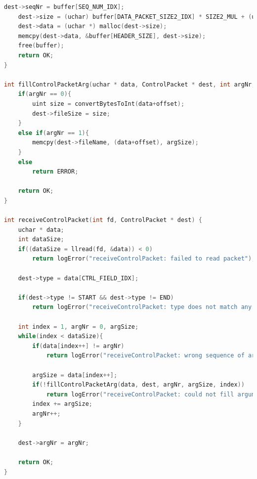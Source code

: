 \documentclass[a4paper, 11pt]{article}
\begin{document}
\begin{lstlisting}[language=C]
	dest->seqNr = buffer[SEQ_NUM_IDX];
	dest->size = (uchar) buffer[DATA_PACKET_SIZE2_IDX] * SIZE2_MUL + (uchar) buffer[DATA_PACKET_SIZE1_IDX];
	dest->data = (uchar *) malloc(dest->size);
	memcpy(dest->data, &buffer[HEADER_SIZE], dest->size);
	free(buffer);
	return OK;
}

int fillControlPacketArg(uchar * data, ControlPacket * dest, int argNr, int argSize, int offset) {
	if(argNr == 0){
		uint size = convertBytesToInt(data+offset);
		dest->fileSize = size;
	}
	else if(argNr == 1){
		memcpy(dest->fileName, (data+offset), argSize);
	}
	else
		return ERROR;

	return OK;
}

int receiveControlPacket(int fd, ControlPacket * dest) {
	uchar * data;
	int dataSize;
	if((dataSize = llread(fd, &data)) < 0)
		return logError("receiveControlPacket: failed to read packet");

	dest->type = data[CTRL_FIELD_IDX];

	if(dest->type != START && dest->type != END)
		return logError("receiveControlPacket: type does not match any known type (START, END)");

	int index = 1, argNr = 0, argSize;
	while(index < dataSize){
		if(data[index++] != argNr)
			return logError("receiveControlPacket: wrong sequence of arguments");

		argSize = data[index++];
		if(!fillControlPacketArg(data, dest, argNr, argSize, index))
			return logError("receiveControlPacket: could not fill argument");
		index += argSize;
		argNr++;
	}

	dest->argNr = argNr;

	return OK;
}
\end{lstlisting}
\newpage
\end{document}
